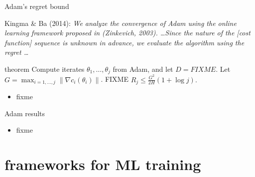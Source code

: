 \documentclass[xcolor={svgnames},
               hyperref={colorlinks,citecolor=DeepPink4,linkcolor=FireBrick,urlcolor=Maroon}]
               {beamer}
\newcommand{\grad}{\nabla}
\newcommand{\ds}{\displaystyle}
\begin{document}
\begin{frame}{Adam's regret bound}

\noindent Kingma \& Ba (2014):  \emph{We analyze the convergence of Adam using the online learning framework proposed in (Zinkevich, 2003). \dots Since the nature of the [cost function] sequence is unknown in advance, we evaluate the algorithm using the regret \dots}

\begin{block}{theorem}
Compute iterates $\theta_1,\dots,\theta_j$ from Adam, and let $D=FIXME$.  Let $G = \max_{i=1,\dots,j} \|\grad c_i(\theta_i)\|$. FIXME $\ds \boxed{R_j \le \frac{G^2}{2 H} (1 + \log j).}$
\end{block}

\begin{itemize}
\item fixme
\end{itemize}
\end{frame}


\begin{frame}{Adam results}

\begin{itemize}
\item fixme
\end{itemize}
\end{frame}


\section{frameworks for ML training}
\end{document}
